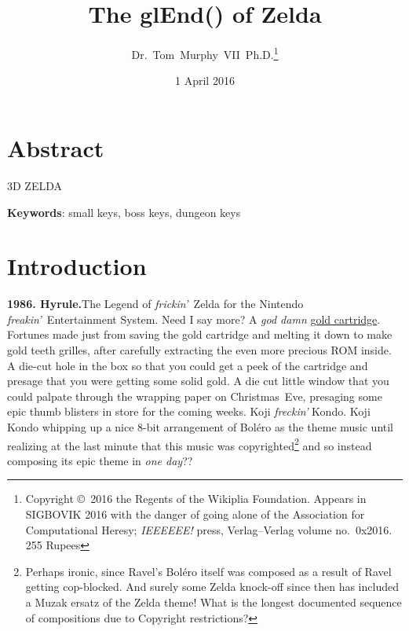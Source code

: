 \documentclass[twocolumn]{article}
\begin{document}
 

\title{The glEnd() of Zelda}
\author{Dr.~Tom~Murphy~VII~Ph.D.\thanks{
    Copyright \copyright\ 2016 the Regents of the Wikiplia Foundation.
    Appears in SIGBOVIK 2016 with the danger of going alone of the
    Association for Computational Heresy; {\em IEEEEEE!} press,
    Verlag--Verlag volume no.~0x2016. 255 Rupees} }

\renewcommand\>{$>$}
\newcommand\<{$<$}

\date{1 April 2016}

\maketitle

\section*{Abstract}
3D ZELDA

\vspace{1em}
{\noindent \small {\bf Keywords}:
  small keys, boss keys, dungeon keys
}

\section{Introduction}

{\bf 1986. Hyrule.}\quad The Legend of {\it frickin'}~Zelda for the Nintendo {\it freakin'}~Entertainment System. Need I say more? A {\it god damn} \uline{gold cartridge}. Fortunes made just from saving the gold cartridge and melting it down to make gold teeth grilles, after carefully extracting the even more precious ROM inside. A die-cut hole in the box so that you could get a peek of the cartridge and presage that you were getting some solid gold. A die cut little window that you could palpate through the wrapping paper on Christmas~Eve, presaging some epic thumb blisters in store for the coming weeks. Koji {\it freckin'} Kondo. Koji Kondo whipping up a nice 8-bit arrangement of Bol\'ero as the theme music until realizing at the last minute that this music was copyrighted\footnote{Perhaps ironic, since Ravel's {Bol\'ero} itself was composed as a result of Ravel getting cop-blocked.\cite{wikipedia2016bolero} And surely some Zelda knock-off since then has included a Muzak ersatz of the Zelda theme! What is the longest documented sequence of compositions due to Copyright restrictions?} and so instead composing its epic theme in {\it one day}??
\end{document}
